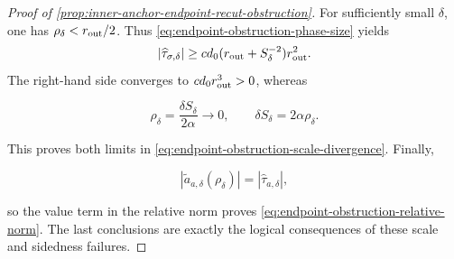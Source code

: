 \begin{proof}[Proof of
\cref{prop:inner-anchor-endpoint-recut-obstruction}]
For sufficiently small \(\delta\), one has
\(\rho_\delta<r_{\rm out}/2\).  Thus
\cref{eq:endpoint-obstruction-phase-size} yields
\begin{equation}
 |\widehat\tau_{\sigma,\delta}|
 \ge c d_0(r_{\rm out}+S_\delta^{-2})r_{\rm out}^2.
                                                        \label{eq:proof-endpoint-obstruction-tau-lower}
\end{equation}
The right-hand side converges to \(cd_0r_{\rm out}^3>0\), whereas

\[
 \rho_\delta=\frac{\delta S_\delta}{2\alpha}\longrightarrow0,
 \qquad
 \delta S_\delta=2\alpha\rho_\delta.
\]

This proves both limits in
\cref{eq:endpoint-obstruction-scale-divergence}.  Finally,

\[
 |\widetilde a_{a,\delta}(\rho_\delta)|
 =|\widehat\tau_{a,\delta}|,
\]

so the value term in the relative norm proves
\cref{eq:endpoint-obstruction-relative-norm}.  The last conclusions are
exactly the logical consequences of these scale and sidedness failures.
\end{proof}


